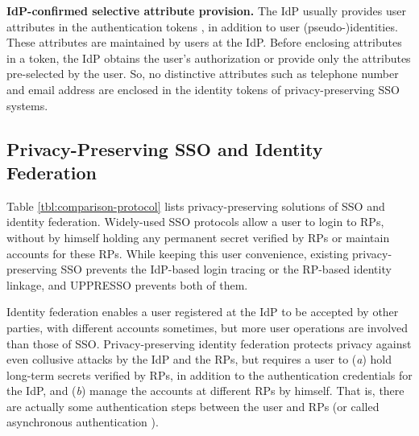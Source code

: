 \noindent\textbf{IdP-confirmed selective attribute provision.}
The IdP usually provides user attributes in the authentication tokens \cite{OpenIDConnect,rfc6749,SAML}, in addition to user (pseudo-)identities.
These attributes are maintained by users at the IdP.
Before enclosing attributes in a token, the IdP obtains the user's authorization or provide only the attributes pre-selected by the user.
So, no distinctive attributes such as telephone number and email address are enclosed in the identity tokens of privacy-preserving SSO systems.

%



\subsection{Privacy-Preserving SSO and Identity Federation}
\label{subsec-solutions}
Table \ref{tbl:comparison-protocol} lists privacy-preserving solutions of SSO and identity federation.
Widely-used SSO protocols \cite{OpenIDConnect,rfc6749,SAML,SAMLIdentifier} allow a user to login to RPs,
        without by himself holding any permanent secret verified by RPs
        or maintain accounts for these RPs.
While keeping this user convenience,
 existing privacy-preserving SSO \cite{BrowserID,SPRESSO,NIST2017draft} prevents the IdP-based login tracing or the RP-based identity linkage,
    and UPPRESSO prevents both of them.

Identity federation enables a user registered at the IdP to be accepted by other parties,
            with different accounts sometimes,
        but more user operations are involved than those of SSO.
Privacy-preserving identity federation \cite{ELPASSO,UnlimitID,hyperledge-idemix,PseudoID,Opaak}
    protects privacy against even collusive attacks by the IdP and the RPs,
    but requires a user to (\emph{a}) hold long-term secrets verified by RPs,
            in addition to the authentication credentials for the IdP,
                and (\emph{b}) manage the accounts at different RPs by himself.
That is, there are actually some authentication steps between the user and RPs (or called asynchronous authentication \cite{ELPASSO}).


